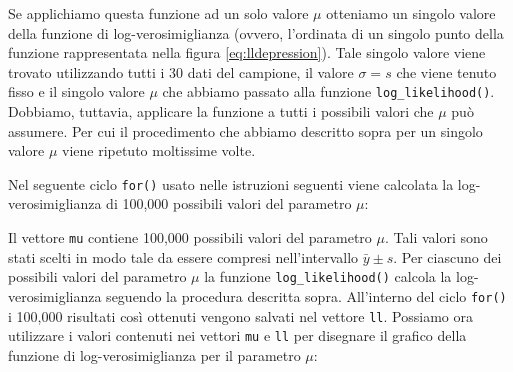 \documentclass[
]{memoir}
\newenvironment{Shaded}{\begin{snugshade}}{\end{snugshade}}
\newcommand{\AttributeTok}[1]{\textcolor[rgb]{0.77,0.63,0.00}{#1}}
\newcommand{\ConstantTok}[1]{\textcolor[rgb]{0.00,0.00,0.00}{#1}}
\newcommand{\ControlFlowTok}[1]{\textcolor[rgb]{0.13,0.29,0.53}{\textbf{#1}}}
\newcommand{\DecValTok}[1]{\textcolor[rgb]{0.00,0.00,0.81}{#1}}
\newcommand{\FloatTok}[1]{\textcolor[rgb]{0.00,0.00,0.81}{#1}}
\newcommand{\FunctionTok}[1]{\textcolor[rgb]{0.00,0.00,0.00}{#1}}
\newcommand{\NormalTok}[1]{#1}
\newcommand{\OtherTok}[1]{\textcolor[rgb]{0.56,0.35,0.01}{#1}}
\newcommand{\SpecialCharTok}[1]{\textcolor[rgb]{0.00,0.00,0.00}{#1}}
\theoremstyle{definition}
\theoremstyle{definition}
\theoremstyle{definition}
\theoremstyle{definition}
\theoremstyle{remark}
\begin{document}
Se applichiamo questa funzione ad un solo valore \(\mu\) otteniamo un singolo valore della funzione di log-verosimiglianza (ovvero, l'ordinata di un singolo punto della funzione rappresentata nella figura \eqref{eq:lldepression}). Tale singolo valore viene trovato utilizzando tutti i 30 dati del campione, il valore \(\sigma = s\) che viene tenuto fisso e il singolo valore \(\mu\) che abbiamo passato alla funzione \texttt{log\_likelihood()}. Dobbiamo, tuttavia, applicare la funzione a tutti i possibili valori che \(\mu\) può assumere. Per cui il procedimento che abbiamo descritto sopra per un singolo valore \(\mu\) viene ripetuto moltissime volte.

Nel seguente ciclo \texttt{for()} usato nelle istruzioni seguenti viene calcolata la log-verosimiglianza di 100,000 possibili valori del parametro \(\mu\):

\begin{Shaded}
\end{Shaded}

Il vettore \texttt{mu} contiene 100,000 possibili valori del parametro \(\mu\). Tali valori sono stati scelti in modo tale da essere compresi nell'intervallo \(\bar{y} \pm s\). Per ciascuno dei possibili valori del parametro \(\mu\) la funzione \texttt{log\_likelihood()} calcola la log-verosimiglianza seguendo la procedura descritta sopra. All'interno del ciclo \texttt{for()} i 100,000 risultati così ottenuti vengono salvati nel vettore \texttt{ll}. Possiamo ora utilizzare i valori contenuti nei vettori \texttt{mu} e \texttt{ll} per disegnare il grafico della funzione di log-verosimiglianza per il parametro \(\mu\):
\end{document}
